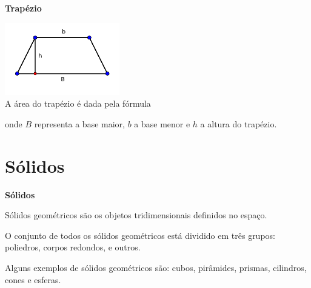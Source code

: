 \textbf{Trapézio}
\begin{multicols}{2}
\includegraphics[width=5cm]{./cap_geometria/figs/trapezioL} \\
A área do trapézio é dada pela fórmula


onde $B$ representa a base maior, $b$ a base menor e $h$ a altura do trapézio.
\end{multicols}

\section{Sólidos}

\vskip0.3cm

\colorbox{azul}{
 \begin{minipage}{0.9\linewidth}
 \begin{center}
 \textbf{Sólidos}

  Sólidos geométricos são os objetos tridimensionais definidos no espaço.

  O conjunto de todos os sólidos geométricos está dividido em três grupos: poliedros, corpos redondos, e outros.

 \end{center}
 \end{minipage}}

 \vskip0.3cm

 Alguns exemplos de sólidos geométricos são: cubos, pirâmides, prismas, cilindros, cones e esferas.



